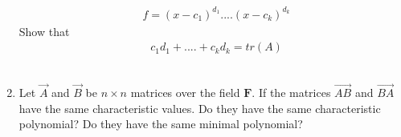 \begin{enumerate}[label=\thesubsection.\arabic*.,ref=\thesubsection.\theenumi]
\begin{align}
& f = (x-c_1)^{d_1}....(x-c_k)^{d_k} 
\end{align}
Show that
\begin{align}
& c_1d_1+....+c_kd_k = tr(A)
\end{align}
%
%
\\
\solution

\twocolumn
\item 	Let $\vec{A}$ and $\vec{B}$ be $n\times n$ matrices over the field $\mathbf{F}$. If the matrices $\vec{AB}$ and $\vec{BA}$ have the same characteristic values. Do they have the same characteristic polynomial? Do they have the same minimal polynomial? 
%
\\
\solution

\end{enumerate}
